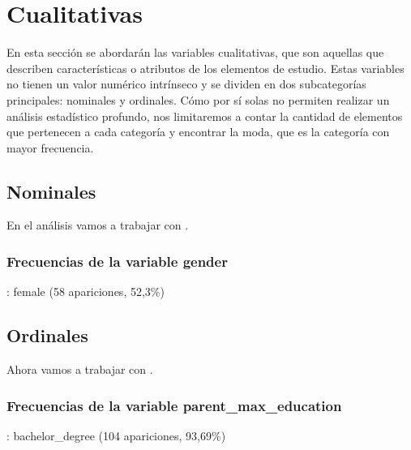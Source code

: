 \section{Cualitativas}
En esta sección se abordarán las variables cualitativas, que son aquellas que describen
características o atributos de los elementos de estudio. Estas variables no tienen
un valor numérico intrínseco y se dividen en dos subcategorías principales: nominales y ordinales.
Cómo por sí solas no permiten realizar un análisis estadístico profundo, nos limitaremos a contar la
cantidad de elementos que pertenecen a cada categoría y encontrar la moda, que es la categoría con
mayor frecuencia.

\subsection{Nominales}
En el análisis vamos a trabajar con .

\subsubsection{Frecuencias de la variable gender}


\AnalisisDescriptivo
{}: female (58 apariciones, 52,3\%) 




\subsection{Ordinales}
Ahora vamos a trabajar con .

\subsubsection{Frecuencias de la variable parent\_max\_education}


\AnalisisDescriptivo
{}: bachelor\_degree (104 apariciones, 93,69\%)


